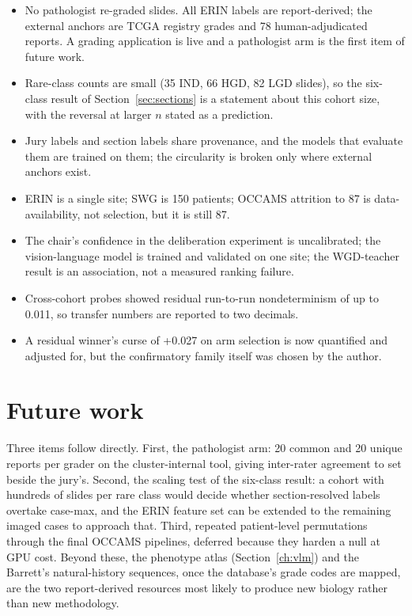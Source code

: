 \begin{itemize}
\item No pathologist re-graded slides. All ERIN labels are report-derived; the external anchors are TCGA registry grades and 78 human-adjudicated reports. A grading application is live and a pathologist arm is the first item of future work.
\item Rare-class counts are small (35 IND, 66 HGD, 82 LGD slides), so the six-class result of Section~\ref{sec:sections} is a statement about this cohort size, with the reversal at larger $n$ stated as a prediction.
\item Jury labels and section labels share provenance, and the models that evaluate them are trained on them; the circularity is broken only where external anchors exist.
\item ERIN is a single site; SWG is 150 patients; OCCAMS attrition to 87 is data-availability, not selection, but it is still 87.
\item The chair's confidence in the deliberation experiment is uncalibrated; the vision-language model is trained and validated on one site; the WGD-teacher result is an association, not a measured ranking failure.
\item Cross-cohort probes showed residual run-to-run nondeterminism of up to 0.011, so transfer numbers are reported to two decimals.
\item A residual winner's curse of +0.027 on arm selection is now quantified and adjusted for, but the confirmatory family itself was chosen by the author.
\end{itemize}

\section{Future work}

Three items follow directly. First, the pathologist arm: 20 common and 20 unique reports per grader on the cluster-internal tool, giving inter-rater agreement to set beside the jury's. Second, the scaling test of the six-class result: a cohort with hundreds of slides per rare class would decide whether section-resolved labels overtake case-max, and the ERIN feature set can be extended to the remaining imaged cases to approach that. Third, repeated patient-level permutations through the final OCCAMS pipelines, deferred because they harden a null at GPU cost. Beyond these, the phenotype atlas (Section~\ref{ch:vlm}) and the Barrett's natural-history sequences, once the database's grade codes are mapped, are the two report-derived resources most likely to produce new biology rather than new methodology.

